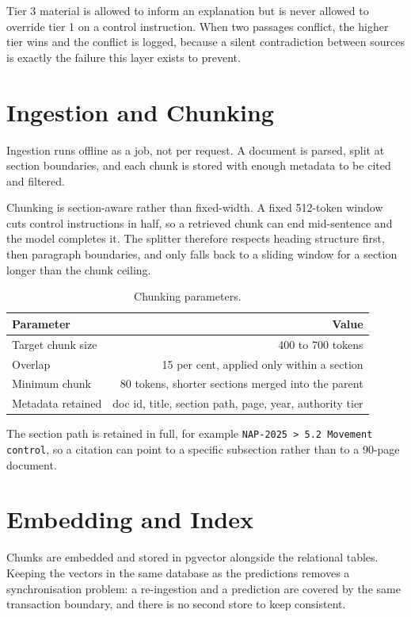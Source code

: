 \documentclass[10pt,openany]{report}
\begin{document}
Tier 3 material is allowed to inform an explanation but is never allowed to override tier 1 on a
control instruction. When two passages conflict, the higher tier wins and the conflict is logged,
because a silent contradiction between sources is exactly the failure this layer exists to
prevent.

\section{Ingestion and Chunking}

Ingestion runs offline as a job, not per request. A document is parsed, split at section
boundaries, and each chunk is stored with enough metadata to be cited and filtered.

Chunking is section-aware rather than fixed-width. A fixed 512-token window cuts control
instructions in half, so a retrieved chunk can end mid-sentence and the model completes it. The
splitter therefore respects heading structure first, then paragraph boundaries, and only falls back
to a sliding window for a section longer than the chunk ceiling.

\begin{table}[htbp]
\centering
\caption{Chunking parameters.}
\label{tab:chunking}
\small
\begin{tabular}{@{}lr@{}}
\toprule
\textbf{Parameter} & \textbf{Value} \\
\midrule
Target chunk size & 400 to 700 tokens \\
Overlap & 15 per cent, applied only within a section \\
Minimum chunk & 80 tokens, shorter sections merged into the parent \\
Metadata retained & doc id, title, section path, page, year, authority tier \\
\bottomrule
\end{tabular}
\end{table}

The section path is retained in full, for example
\texttt{NAP-2025 > 5.2 Movement control}, so a citation can point to a specific
subsection rather than to a 90-page document.

\section{Embedding and Index}

Chunks are embedded and stored in pgvector alongside the relational tables. Keeping the vectors in
the same database as the predictions removes a synchronisation problem: a re-ingestion and a
prediction are covered by the same transaction boundary, and there is no second store to keep
consistent.
\end{document}
